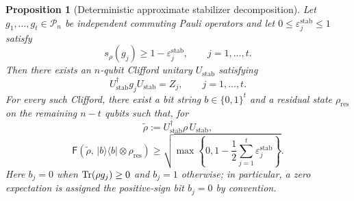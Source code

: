 \documentclass[
  aps,
  prx,
  reprint,
  superscriptaddress,
  amsmath,
  amssymb,
  nofootinbib,
  longbibliography
]{revtex4-2}
\newtheorem{proposition}[theorem]{Proposition}
\newcommand{\F}{\mathsf{F}}
\newcommand{\Pc}{\mathcal{P}}
\begin{document}
\begin{proposition}[Deterministic approximate stabilizer decomposition]
\label{prop:supp-approximate-stabilizer-decomposition}
Let $g_1,\dots,g_t\in \Pc_n$ be independent commuting Pauli operators
and let $0\le \varepsilon_j^{\mathrm{stab}}\le 1$ satisfy
\begin{equation}
s_\rho(g_j)\ge 1-\varepsilon_j^{\mathrm{stab}},
\qquad
j=1,\dots,t.
\end{equation}
Then there exists an $n$-qubit Clifford unitary $U_{\mathrm{stab}}$ satisfying
\begin{equation}
U_{\mathrm{stab}}^\dagger g_jU_{\mathrm{stab}}=Z_j,
\qquad
j=1,\dots,t.
\label{eq:supp-stabilizer-diagonalization}
\end{equation}
For every such Clifford, there exist a bit string $b\in\{0,1\}^t$ and a
residual state $\rho_{\mathrm{res}}$ on the remaining $n-t$ qubits such that,
for
\begin{equation}
\tilde\rho
:=
U_{\mathrm{stab}}^\dagger \rho\, U_{\mathrm{stab}},
\end{equation}
\begin{equation}
\F\!\left(
\tilde\rho,\,
|b\rangle\!\langle b|\otimes \rho_{\mathrm{res}}
\right)
\ge
\sqrt{
\max\left\{0,1-\frac12\sum_{j=1}^t \varepsilon_j^{\mathrm{stab}}\right\}
}.
\label{eq:supp-stabilizer-fidelity}
\end{equation}
Here $b_j=0$ when $\Tr(\rho g_j)\ge0$ and $b_j=1$ otherwise; in particular,
a zero expectation is assigned the positive-sign bit $b_j=0$ by convention.
\end{proposition}
\end{document}
